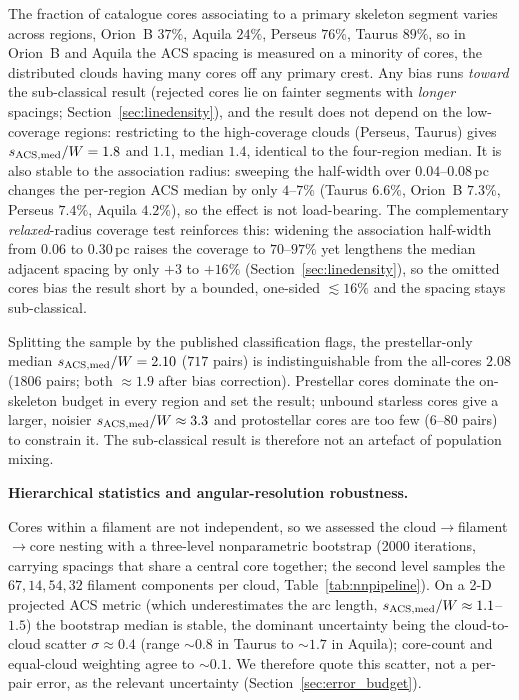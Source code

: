 \documentclass[usenatbib,twoside,twocolumn]{mnras}
\begin{document}
The fraction of catalogue cores associating to a primary skeleton segment varies across regions, Orion~B $37\%$, Aquila $24\%$, Perseus $76\%$, Taurus $89\%$, so in Orion~B and Aquila the ACS spacing is measured on a minority of cores, the distributed clouds having many cores off any primary crest. Any bias runs \emph{toward} the sub-classical result (rejected cores lie on fainter segments with \emph{longer} spacings; Section~\ref{sec:linedensity}), and the result does not depend on the low-coverage regions: restricting to the high-coverage clouds (Perseus, Taurus) gives $s_{\rm ACS,med}/W=1.8$ and $1.1$, median $1.4$, identical to the four-region median. It is also stable to the association radius: sweeping the half-width over $0.04$--$0.08$\,pc changes the per-region ACS median by only $4$--$7\%$ (Taurus $6.6\%$, Orion~B $7.3\%$, Perseus $7.4\%$, Aquila $4.2\%$), so the effect is not load-bearing. The complementary \emph{relaxed}-radius coverage test reinforces this: widening the association half-width from $0.06$ to $0.30$\,pc raises the coverage to $70$--$97\%$ yet lengthens the median adjacent spacing by only $+3$ to $+16\%$ (Section~\ref{sec:linedensity}), so the omitted cores bias the result short by a bounded, one-sided $\lesssim16\%$ and the spacing stays sub-classical.

Splitting the sample by the published classification flags, the prestellar-only median $s_{\rm ACS,med}/W=2.10$ ($717$ pairs) is indistinguishable from the all-cores $2.08$ ($1806$ pairs; both $\approx1.9$ after bias correction). Prestellar cores dominate the on-skeleton budget in every region and set the result; unbound starless cores give a larger, noisier $s_{\rm ACS,med}/W\approx3.3$ and protostellar cores are too few ($6$--$80$ pairs) to constrain it. The sub-classical result is therefore not an artefact of population mixing.

\smallskip\noindent\textbf{Hierarchical statistics and angular-resolution robustness.}

Cores within a filament are not independent, so we assessed the cloud$\to$filament$\to$core nesting with a three-level nonparametric bootstrap (2000 iterations, carrying spacings that share a central core together; the second level samples the $67,14,54,32$ filament components per cloud, Table~\ref{tab:nnpipeline}). On a 2-D projected ACS metric (which underestimates the arc length, $s_{\rm ACS,med}/W\approx1.1$--$1.5$) the bootstrap median is stable, the dominant uncertainty being the cloud-to-cloud scatter $\sigma\approx0.4$ (range $\sim0.8$ in Taurus to $\sim1.7$ in Aquila); core-count and equal-cloud weighting agree to $\sim0.1$. We therefore quote this scatter, not a per-pair error, as the relevant uncertainty (Section~\ref{sec:error_budget}).
\end{document}
